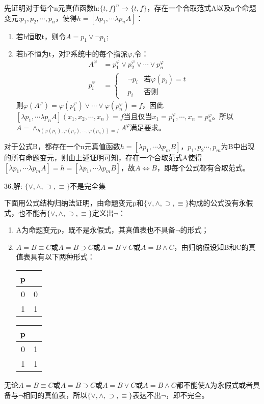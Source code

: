 \documentclass[a4paper]{ctexart}
\begin{document}
先证明对于每个n元真值函数h:$\{t,f\}^n\rightarrow\{t,f\}$，存在一个合取范式A以及n个命题变元:$p_1,p_2,\cdots,p_n$，使得$h=[\lambda p_1,\cdots\lambda p_nA]$：
\begin{enumerate}
  \item 若h恒取t，则令$A=p_1\vee\neg p_1$;
  \item 若h不恒为t，对P系统中的每个指派$\varphi$,令：
  \begin{align*}
    A^\varphi&=p_1^\varphi\vee p_2^\varphi\vee\cdots\vee p_n^\varphi \\
    p_i^\varphi&=\left\{
      \begin{aligned}
        &\neg p_i &\text{若}\varphi(p_i)=t \\
        &p_i &\text{否则}
      \end{aligned}
    \right.
  \end{align*}
  则$\varphi(A^\varphi)=\varphi(p_1^\varphi)\vee\cdots\vee\varphi(p_n^\varphi)=f$，因此$[\lambda p_1,\cdots\lambda p_nA](x_1,x_2,\cdots,x_n)=f$当且仅当$x_1=p_1^\varphi,\cdots,x_n=p_n^\varphi$。所以$A=\wedge_{h(\varphi(p_1),\varphi(p_2),\cdots,\varphi(p_n))=f}A^\varphi$满足要求。
\end{enumerate}
对于公式B，都存在一个n元真值函数$h=[\lambda p_1,\cdots\lambda p_mB]$，$p_1,p_2\cdots,p_m$为B中出现的所有命题变元，则由上述证明可知，存在一个合取范式A使得$[\lambda p_1,\cdots\lambda p_mA]=h=[\lambda p_1,\cdots\lambda p_mB]$，故$A\Leftrightarrow B$，即每个公式都有合取范式。\newline

\noindent 36.解:
$\{\vee,\wedge,\supset,\equiv\}$不是完全集

下面用公式结构归纳法证明，由命题变元p和$\{\vee,\wedge,\supset,\equiv\}$构成的公式没有永假式，也不能有$\{\vee,\wedge,\supset,\equiv\}$定义出$\neg$：
\begin{enumerate}
  \item A为命题变元p，既不是永假式，其真值表也不具备$\neg$的形式；
  \item $A=B\equiv C$或$A=B\supset C$或$A=B\vee C$或$A=B\wedge C$，由归纳假设知B和C的真值表具有以下两种形式：
  \begin{table}[!hbp]
    \begin{tabular}{c|c}
      p &  \\
      \hline
      0 & 0 \\
      1 & 1 \\
    \end{tabular}
    \hfil
    \begin{tabular}{c|c}
      p &  \\
      \hline
      0 & 1  \\
      1 & 1  \\
    \end{tabular}    
  \end{table}
\end{enumerate}
  无论$A=B\equiv C$或$A=B\supset C$或$A=B\vee C$或$A=B\wedge C$都不能使A为永假式或者具备与$\neg$相同的真值表，所以$\{\vee,\wedge,\supset,\equiv\}$表达不出$\neg$，即不完全。\newline
  
\end{document}
